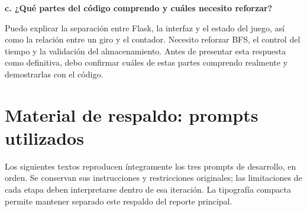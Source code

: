 \documentclass[12pt,letterpaper]{article}
\begin{document}
\textbf{c. ¿Qué partes del código comprendo y cuáles necesito reforzar?}

Puedo explicar la separación entre Flask, la interfaz y el estado del juego, así como la relación entre un giro y el contador. Necesito reforzar BFS, el control del tiempo y la validación del almacenamiento. Antes de presentar esta respuesta como definitiva, debo confirmar cuáles de estas partes comprendo realmente y demostrarlas con el código.

\clearpage
\section*{Material de respaldo: prompts utilizados}
\label{anexo:prompts}
Los siguientes textos reproducen íntegramente los tres prompts de desarrollo, en orden. Se conservan sus instrucciones y restricciones originales; las limitaciones de cada etapa deben interpretarse dentro de esa iteración. La tipografía compacta permite mantener separado este respaldo del reporte principal.


\firmareporte
\end{document}
